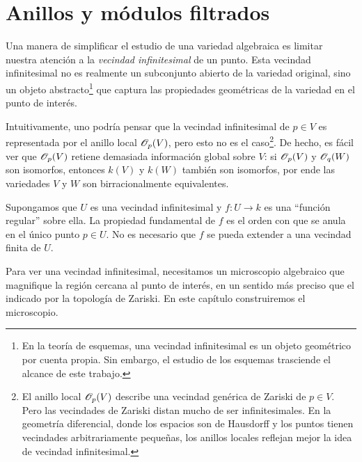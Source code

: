 \chapter{Anillos y módulos filtrados}

\noindent Una manera de simplificar el estudio de una variedad algebraica es limitar nuestra atención a la \textit{vecindad infinitesimal} de un punto. Esta vecindad infinitesimal no es realmente un subconjunto abierto de la variedad original, sino un objeto abstracto\footnote{En la teoría de esquemas, una vecindad infinitesimal es un objeto geométrico por cuenta propia. Sin embargo, el estudio de los esquemas trasciende el alcance de este trabajo.} que captura las propiedades geométricas de la variedad en el punto de interés.

Intuitivamente, uno podría pensar que la vecindad infinitesimal de $p \in V$ es representada por el anillo local $\mathscr O_p(V)$, pero esto no es el caso\footnote{El anillo local $\mathscr O_p(V)$ describe una vecindad genérica de Zariski de $p \in V$. Pero las vecindades de Zariski distan mucho de ser infinitesimales. En la geometría diferencial, donde los espacios son de Hausdorff y los puntos tienen vecindades arbitrariamente pequeñas, los anillos locales reflejan mejor la idea de vecindad infinitesimal.}. De hecho, es fácil ver que $\mathscr O_p(V)$ retiene demasiada información global sobre $V$: si $\mathscr O_p(V)$ y $\mathscr O_q(W)$ son isomorfos, entonces $k(V)$ y $k(W)$ también son isomorfos, por ende las variedades $V$ y $W$ son birracionalmente equivalentes.

Supongamos que $U$ es una vecindad infinitesimal y $f : U \to k$ es una ``función regular'' sobre ella. La propiedad fundamental de $f$ es el orden con que se anula en el único punto $p \in U$. No es necesario que $f$ se pueda extender a una vecindad finita de $U$.

Para ver una vecindad infinitesimal, necesitamos un microscopio algebraico que magnifique la región cercana al punto de interés, en un sentido más preciso que el indicado por la topología de Zariski. En este capítulo construiremos el microscopio.
